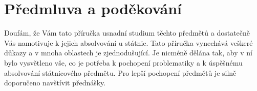 \chapter*{Předmluva a poděkování}



Doufám, že Vám tato příručka usnadní studium těchto předmětů a dostatečně Vás namotivuje k jejich absolvování u státnic. Tato příručka vynechává veškeré důkazy a v mnoha oblastech je zjednodušující. Je nicméně dělána tak, aby v ní bylo vysvětleno vše, co je potřeba k pochopení problematiky a k úspěšnému absolvování státnicového předmětu. Pro lepší pochopení předmětů je silně doporučeno navštívit přednášky.


